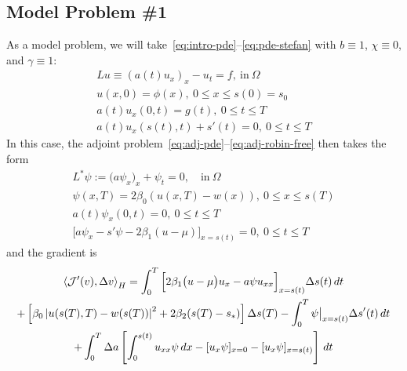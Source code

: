 \documentclass[letterpaper, 10pt]{amsart}
\theoremstyle{definition}
\theoremstyle{remark}
\newcommand{\lnorm}[1]{\left\vert #1\right\vert}%
\begin{document}
\subsection{Model Problem \#1}
As a model problem, we will take~\eqref{eq:intro-pde}--\eqref{eq:pde-stefan} with $b\equiv 1$, $\chi \equiv 0$, and $\gamma \equiv 1$:
\begin{gather}
  Lu \equiv {(a(t) u_x)}_x - u_{t} = f,~\text{in}~\Omega
  \\
  u(x,0) = \phi (x),~0 \leq x \leq s(0) = s_0
  \\
  a(t) u_x (0,t) = g(t),~0 \leq t \leq T
  \\
  a(t) u_x (s(t),t) + s'(t) = 0,~0 \leq t \leq
  T
\end{gather}
In this case, the adjoint problem~\eqref{eq:adj-pde}--\eqref{eq:adj-robin-free} then takes the form
\begin{gather}
  L^{*} \psi := \big(a \psi_x\big)_x + \psi_t = 0,\quad\text{in}~\Omega
  \\
  \psi(x, T) = 2\beta_0(u(x, T) - w(x)),~0 \leq x \leq s(T)
  \\
  a(t)\psi_x(0, t) =0,~0 \leq t \leq T
  \\
  \Big[a \psi_x - s'\psi - 2\beta_1(u - \mu)\Big]_{x=s(t)}=0, ~0 \leq t \leq T
\end{gather}
and the gradient is
\begin{gather}
  \left\langle \J'(v),\Delta v \right\rangle_H
  = \int_0^T \Big[2\beta_1\big(u - \mu\big)u_x - a \psi u_{xx} \Big]_{x=s(t)} {\Delta s}(t)\,dt \nonumber
  \\
  +
  \left[\beta_0\lnorm{u(s(T),T) - w(s(T))}^2 + 2 \beta_2 (s(T) - s_*)\right] {\Delta s}(T)
  - \int_0^T \psi \big\vert_{x=s(t)} {\Delta s}'(t) \,dt\nonumber
  \\
  + \int_0^T {\Delta a} \left[
    \int_0^{s(t)}  u_{xx} \psi \,dx
    - [u_x \psi]_{x=0}
    - [u_x\psi]_{x=s(t)}
  \right]\,dt
\end{gather}


\appendix
\end{document}
